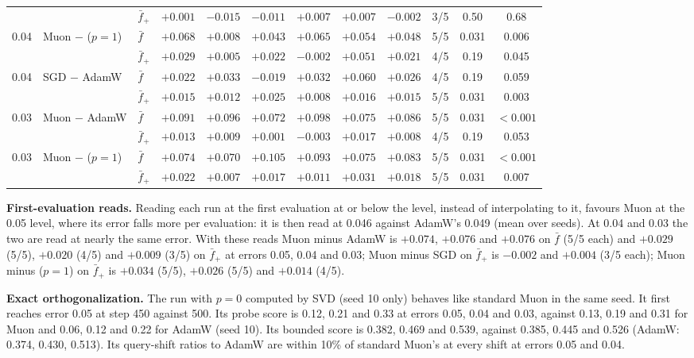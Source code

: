 \begin{table}[h]
\begin{tabular}{@{}lllrrrrrrccc@{}}
 &  & $\bar f_+$ & $+0.001$ & $-0.015$ & $-0.011$ & $+0.007$ & $+0.007$ & $-0.002$ & 3/5 & 0.50 & 0.68 \\
0.04 & Muon $-$ ($p{=}1$) & $\bar f$ & $+0.068$ & $+0.008$ & $+0.043$ & $+0.065$ & $+0.054$ & $+0.048$ & 5/5 & 0.031 & 0.006 \\
 &  & $\bar f_+$ & $+0.029$ & $+0.005$ & $+0.022$ & $-0.002$ & $+0.051$ & $+0.021$ & 4/5 & 0.19 & 0.045 \\
0.04 & SGD $-$ AdamW & $\bar f$ & $+0.022$ & $+0.033$ & $-0.019$ & $+0.032$ & $+0.060$ & $+0.026$ & 4/5 & 0.19 & 0.059 \\
 &  & $\bar f_+$ & $+0.015$ & $+0.012$ & $+0.025$ & $+0.008$ & $+0.016$ & $+0.015$ & 5/5 & 0.031 & 0.003 \\
\midrule
0.03 & Muon $-$ AdamW & $\bar f$ & $+0.091$ & $+0.096$ & $+0.072$ & $+0.098$ & $+0.075$ & $+0.086$ & 5/5 & 0.031 & $<0.001$ \\
 &  & $\bar f_+$ & $+0.013$ & $+0.009$ & $+0.001$ & $-0.003$ & $+0.017$ & $+0.008$ & 4/5 & 0.19 & 0.053 \\
0.03 & Muon $-$ ($p{=}1$) & $\bar f$ & $+0.074$ & $+0.070$ & $+0.105$ & $+0.093$ & $+0.075$ & $+0.083$ & 5/5 & 0.031 & $<0.001$ \\
 &  & $\bar f_+$ & $+0.022$ & $+0.007$ & $+0.017$ & $+0.011$ & $+0.031$ & $+0.018$ & 5/5 & 0.031 & 0.007 \\
\bottomrule
\end{tabular}
\end{table}

\textbf{First-evaluation reads.} Reading each run at the first evaluation at or below the level, instead of interpolating to it, favours Muon at the 0.05 level, where its error falls more per evaluation: it is then read at 0.046 against AdamW's 0.049 (mean over seeds). At 0.04 and 0.03 the two are read at nearly the same error. With these reads Muon minus AdamW is $+0.074$, $+0.076$ and $+0.076$ on $\bar f$ (5/5 each) and $+0.029$ (5/5), $+0.020$ (4/5) and $+0.009$ (3/5) on $\bar f_+$ at errors 0.05, 0.04 and 0.03; Muon minus SGD on $\bar f_+$ is $-0.002$ and $+0.004$ (3/5 each); Muon minus ($p=1$) on $\bar f_+$ is $+0.034$ (5/5), $+0.026$ (5/5) and $+0.014$ (4/5).

\textbf{Exact orthogonalization.} The run with $p=0$ computed by SVD (seed 10 only) behaves like standard Muon in the same seed. It first reaches error 0.05 at step 450 against 500. Its probe score is 0.12, 0.21 and 0.33 at errors 0.05, 0.04 and 0.03, against 0.13, 0.19 and 0.31 for Muon and 0.06, 0.12 and 0.22 for AdamW (seed 10). Its bounded score is 0.382, 0.469 and 0.539, against 0.385, 0.445 and 0.526 (AdamW: 0.374, 0.430, 0.513). Its query-shift ratios to AdamW are within 10\% of standard Muon's at every shift at errors 0.05 and 0.04.

